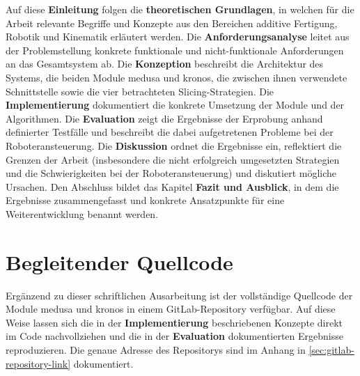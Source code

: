         Auf diese \textbf{Einleitung} folgen die \textbf{theoretischen Grundlagen}, in welchen für die Arbeit relevante Begriffe und Konzepte aus den Bereichen additive Fertigung, Robotik und Kinematik erläutert werden.
        Die \textbf{Anforderungsanalyse} leitet aus der Problemstellung konkrete funktionale und nicht-funktionale Anforderungen an das Gesamtsystem ab.
        Die \textbf{Konzeption} beschreibt die Architektur des Systems, die beiden Module \ac{medusa} und \ac{kronos}, die zwischen ihnen verwendete Schnittstelle sowie die vier betrachteten Slicing-Strategien.
        Die \textbf{Implementierung} dokumentiert die konkrete Umsetzung der Module und der Algorithmen.
        Die \textbf{Evaluation} zeigt die Ergebnisse der Erprobung anhand definierter Testfälle und beschreibt die dabei aufgetretenen Probleme bei der Roboteransteuerung.
        Die \textbf{Diskussion} ordnet die Ergebnisse ein, reflektiert die Grenzen der Arbeit (insbesondere die nicht erfolgreich umgesetzten Strategien und die Schwierigkeiten bei der Roboteransteuerung) und diskutiert mögliche Ursachen.
        Den Abschluss bildet das Kapitel \textbf{Fazit und Ausblick}, in dem die Ergebnisse zusammengefasst und konkrete Ansatzpunkte für eine Weiterentwicklung benannt werden.

    \section{Begleitender Quellcode}\label{sec:accompanying-source-code}
        Ergänzend zu dieser schriftlichen Ausarbeitung ist der vollständige Quellcode der Module \ac{medusa} und \ac{kronos} in einem GitLab-Repository verfügbar.
        Auf diese Weise lassen sich die in der \textbf{Implementierung} beschriebenen Konzepte direkt im Code nachvollziehen und die in der \textbf{Evaluation} dokumentierten Ergebnisse reproduzieren.
        Die genaue Adresse des Repositorys sind im Anhang in \cref{sec:gitlab-repository-link} dokumentiert.
